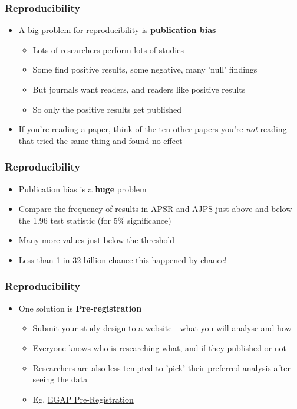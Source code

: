 \documentclass[xcolor=x11names,compress]{beamer}\usepackage[]{graphicx}\usepackage[]{xcolor}
\renewcommand{\(}{\begin{columns}}
\renewcommand{\)}{\end{columns}}
\newcommand{\<}[1]{\begin{column}{#1}}
\renewcommand{\>}{\end{column}}
\begin{document}
\begin{frame}
\frametitle{Reproducibility}
\begin{itemize}
\item A big problem for reproducibility is \textbf{publication bias}
\pause
\begin{itemize}
\item Lots of researchers perform lots of studies
\pause
\item Some find positive results, some negative, many 'null' findings
\pause
\item But journals want readers, and readers like positive results
\pause
\item So only the positive results get published
\pause
\end{itemize}
\item If you're reading a paper, think of the ten other papers you're \textit{not} reading that tried the same thing and found no effect
\end{itemize}
\end{frame}

\begin{frame}
\frametitle{Reproducibility}
\begin{itemize}
\item Publication bias is a \textbf{huge} problem
\pause
\item Compare the frequency of results in APSR and AJPS just above and below the 1.96 test statistic (for 5\% significance)
\pause
\item Many more values just below the threshold
\pause
\item Less than 1 in 32 billion chance this happened by chance!
\end{itemize}
\end{frame}




\begin{frame}
\frametitle{Reproducibility}
\begin{itemize}
\item One solution is \textbf{Pre-registration}
\pause
\begin{itemize}
\item Submit your study design to a website - what you will analyse and how
\pause
\item Everyone knows who is researching what, and if they published or not
\pause
\item Researchers are also less tempted to 'pick' their preferred analysis after seeing the data
\pause
\item Eg. \href{https://egap.org/content/registration}{EGAP Pre-Registration}
\end{itemize}
\end{itemize}
\end{frame}
\end{document}

